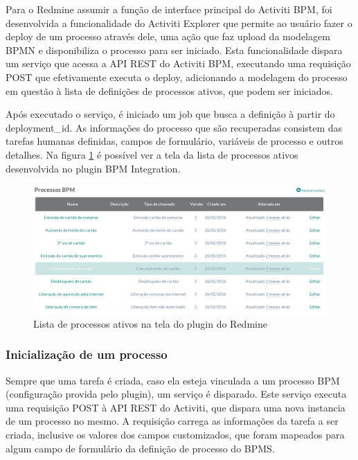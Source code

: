 Para o Redmine assumir a função de interface principal do Activiti BPM, foi desenvolvida a funcionalidade do Activiti Explorer que permite ao usuário fazer o deploy de um processo através dele, uma ação que faz upload da modelagem BPMN e disponibiliza o processo para ser iniciado. Esta funcionalidade dispara um serviço que acessa a API REST do Activiti BPM, executando uma requisição POST que efetivamente executa o deploy, adicionando a modelagem do processo em questão à lista de definições de processos ativos, que podem ser iniciados.

Após executado o serviço, é iniciado um job que busca a definição à partir do deployment\_id. As informações do processo que são recuperadas consistem das tarefas humanas definidas, campos de formulário, variáveis de processo e outros detalhes.
Na figura \ref{fig:process_list} é possível ver a tela da lista de processos ativos desenvolvida no plugin BPM Integration.

\begin{figure}[H]
\centering
\includegraphics[width=1\textwidth]{imagens/plugin_process_list.png}
\caption{Lista de processos ativos na tela do plugin do Redmine}
\label{fig:process_list}
\end{figure}

\subsubsection{Inicialização de um processo}\label{sec:integracao_redmine_activiti_sincronizacao_inicializacao_processo}
Sempre que uma tarefa é criada, caso ela esteja vinculada a um processo BPM (configuração provida pelo plugin), um serviço é disparado. Este serviço executa uma requisição POST à API REST do Activiti, que dispara uma nova instancia de um processo no mesmo. A requisição carrega as informações da tarefa a ser criada, inclusive os valores dos campos customizados, que foram mapeados para algum campo de formulário da definição de processo do BPMS.

